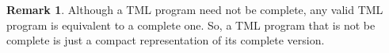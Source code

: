 \documentclass{article}
\theoremstyle{definition}
\newtheorem{remark}[theorem]{Remark}
\begin{document}
    \begin{remark}
        Although a TML program need not be complete, any valid TML program is equivalent to a complete one. So, a TML program that is not be complete is just a compact representation of its complete version.
    \end{remark}
\end{document}
